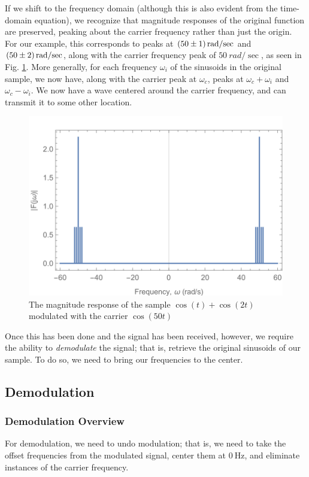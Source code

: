 \documentclass[journal]{IEEEtran}
\begin{document}
If we shift to the frequency domain (although this is also evident from the time-domain equation), we recognize that magnitude responses of the original function are preserved, peaking about the carrier frequency rather than just the origin. For our example, this corresponds to peaks at $\SI{50\pm {1}}{rad\per\sec}$ and $\SI{50\pm{2}}{rad\per\sec}$, along with the carrier frequency peak of $\SI{50}{rad\per\sec}$, as seen in Fig. \ref{fig:modulationsamplefreq}. More generally, for each frequency $\omega_i$ of the sinusoids in the original sample, we now have, along with the carrier peak at $\omega_c$, peaks at $\omega_c+\omega_i$ and $\omega_c-\omega_i$. We now have a wave centered around the carrier frequency, and can transmit it to some other location. 

\begin{figure}[!hbt]
    \centering
    \includegraphics[width=\columnwidth]{ExampleV3Freq.png}
    \caption{The magnitude response of the sample $\cos(t)+\cos(2t)$ modulated with the carrier $\cos(50t)$}
    \label{fig:modulationsamplefreq}
\end{figure}

Once this has been done and the signal has been received, however, we require the ability to \textit{demodulate} the signal; that is, retrieve the original sinusoids of our sample. To do so, we need to bring our frequencies to the center.



\subsection{Demodulation}
\subsubsection{Demodulation Overview}
For demodulation, we need to undo modulation; that is, we need to take the offset frequencies from the modulated signal, center them at $\SI{0}{\hertz}$, and eliminate instances of the carrier frequency. 
\end{document}
